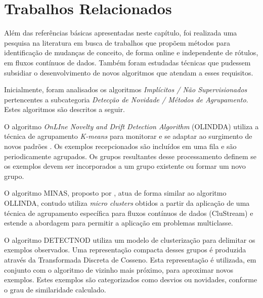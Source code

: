 \documentclass[msc, classic, a4paper]{ufbathesis}
\begin{document}
\section{Trabalhos Relacionados}

Além das referências básicas apresentadas neste capítulo, foi realizada uma pesquisa na literatura em busca de trabalhos que propõem métodos para identificação de mudanças de conceito, de forma online e independente de rótulos, em fluxos contínuos de dados. Também foram estudadas técnicas que pudessem subsidiar o desenvolvimento de novos algoritmos que atendam a esses requisitos.

Inicialmente, foram analisados os algoritmos \textit{Implícitos / Não Supervisionados} pertencentes a subcategoria \textit{Detecção de Novidade / Métodos de Agrupamento}. Estes algoritmos são descritos a seguir.


O algoritmo \textit{OnLIne Novelty and Drift Detection Algorithm} (OLINDDA) utiliza a técnica de agrupamento \textit{K-means} para monitorar e se adaptar ao surgimento de novos padrões \cite{Spinosa:2007:OCA:1244002.1244107}.
Os exemplos recepcionados são incluídos em uma fila e são periodicamente agrupados. Os grupos resultantes desse processamento definem se os exemplos devem ser incorporados a um grupo existente ou formar um novo grupo.

O algoritmo MINAS, proposto por , atua de forma similar ao algoritmo OLLINDA, contudo utiliza \textit{micro clusters} obtidos a partir da aplicação de uma técnica de agrupamento específica para fluxos contínuos de dados (CluStream) e estende a abordagem para permitir a aplicação em problemas multiclasse.

O algoritmo DETECTNOD \cite{Hashemi:Hayat:DETECTNOD:2010} utiliza um modelo de clusterização para delimitar os exemplos observados.
Uma representação compacta desses grupos é produzida através da Transformada Discreta de Cosseno. Esta representação é utilizada, em conjunto com o algoritmo de vizinho mais próximo, para aproximar novos exemplos.
Estes exemplos são categorizados como desvios ou novidades, conforme o grau de similaridade calculado.
\end{document}

